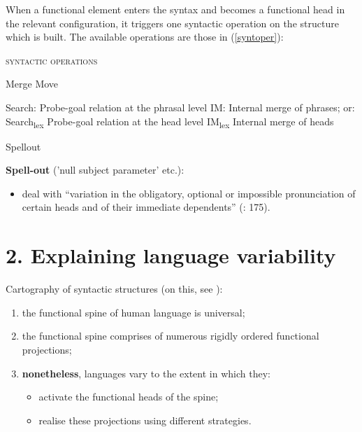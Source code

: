 \documentclass[fleqn,10pt]{wlscirep}
\begin{document}
\noindent When a functional element enters the syntax and becomes a functional head in the relevant configuration, it triggers one syntactic operation on the structure which is built. The available operations are those in (\ref{syntoper}):

\begin{exe}
    \ex \textsc{syntactic operations}
        \begin{xlist}
            \ex Merge
            \ex Move
                \begin{xlist}
                    \ex Search:	Probe-goal relation at the phrasal level
                    \ex IM:	Internal merge of phrases; or:
                    \ex Search\textsubscript{lex}	Probe-goal relation at the head level
                    \ex IM\textsubscript{lex}	Internal merge of heads
                \end{xlist}
            \ex Spellout
        \end{xlist}
        \label{syntoper}
    \end{exe}

\noindent\textbf{Spell-out} ('null subject parameter' etc.): 
\begin{itemize}
    \item[\ding{227}] \vspace*{-2mm} deal with “variation in the obligatory, optional or impossible pronunciation of certain heads and of their immediate dependents” (\citealt{rizzi2017}: 175). 
\end{itemize}

\section*{2. Explaining language variability}

Cartography of syntactic structures (on this, see \citealt{cinquerizzi2010,rizzicinque2016}):
\begin{enumerate}
    \item \vspace*{-2mm} the functional spine of human language is universal;
    \item \vspace*{-2mm} the functional spine comprises of numerous rigidly ordered functional projections;
    \item \vspace*{-2mm} \textbf{nonetheless}, languages vary to the extent in which they:
        \begin{itemize}
            \item[\ding{227}] \vspace*{-2mm} activate the functional heads of the spine;
            \item[\ding{227}] \vspace*{-2mm} realise these projections using different strategies. 
        \end{itemize}
\end{enumerate}
\end{document}
